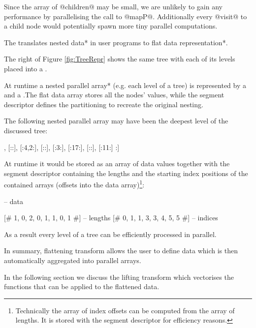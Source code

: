 \documentclass[preamble.tex]{subfiles}
\begin{document}
Since the array of @children@ may be small, we are unlikely to gain any performance by parallelising the call to @mapP@. Additionally every @visit@ to a child node would potentially spawn more tiny parallel computations. 

\begin{bluebox}
The  translates \*nested data* in user programs to \*flat data representation*.
\end{bluebox}

The right of Figure \ref{fig:TreeRepr} shows the same tree with each of its levels placed into a .

At runtime a \*nested parallel array* (e.g. each level of a tree) is represented by a  and a .\isegd The flat data array stores all the nodes' values, while the segment descriptor defines the partitioning to recreate the original nesting.

The following nested parallel array may have been the deepest level of the discussed tree:

\begin{hscode}
[: [:5:], [::], [:4,2:], [::], [:3:], [:17:], [::], [:11:] :]
\end{hscode}

At runtime it would be stored as an array of data values together with the segment descriptor containing the lengths and the starting index positions of the contained arrays (offsets into the data array)\footnote{Technically the array of index offsets can be computed from the array of lengths. It is stored with the segment descriptor for efficiency reasons.}:

\begin{hscode}
[# 5, 4, 2, 3, 17, 11 #]       -- data

[# 1, 0, 2, 0, 1, 1, 0, 1 #]   -- lengths
[# 0, 1, 1, 3, 3, 4, 5, 5 #]   -- indices
\end{hscode}

As a result every level of a tree can be efficiently processed in parallel.

In summary, flattening transform allows the user to define data which is then automatically aggregated into parallel arrays.

In the following section we discuss the lifting transform which vectorises the functions that can be applied to the flattened data.
\end{document}
